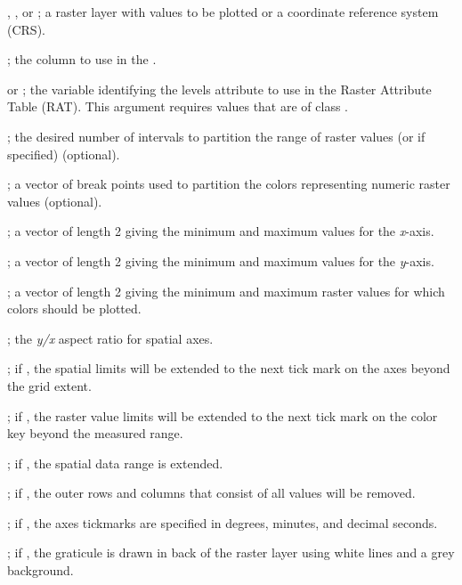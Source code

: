 \documentclass[a4paper]{book}
\begin{document}
\begin{Arguments}
\begin{ldescription}
\item[\code{r}] , , or ; a raster layer with values to be plotted or a coordinate reference system (CRS).
\item[\code{layer}] ; the column to use in the .
\item[\code{att}]  or ; the variable identifying the levels attribute to use in the Raster Attribute Table (RAT).
This argument requires  values that are of class .
\item[\code{n}] ; the desired number of intervals to partition the range of raster values (or  if specified) (optional).
\item[\code{breaks}] ; a vector of break points used to partition the colors representing numeric raster values (optional).
\item[\code{xlim}] ; a vector of length 2 giving the minimum and maximum values for the \emph{x}-axis.
\item[\code{ylim}] ; a vector of length 2 giving the minimum and maximum values for the \emph{y}-axis.
\item[\code{zlim}] ; a vector of length 2 giving the minimum and maximum raster values for which colors should be plotted.
\item[\code{asp}] ; the \emph{y/x} aspect ratio for spatial axes.
\item[\code{extend.xy}] ; if , the spatial limits will be extended to the next tick mark on the axes beyond the grid extent.
\item[\code{extend.z}] ; if , the raster value limits will be extended to the next tick mark on the color key beyond the measured range.
\item[\code{reg.axs}] ; if , the spatial data range is extended.
\item[\code{trim.r}] ; if , the outer rows and columns that consist of all  values will be removed.
\item[\code{dms.tick}] ; if , the axes tickmarks are specified in degrees, minutes, and decimal seconds.
\item[\code{bg.lines}] ; if , the graticule is drawn in back of the raster layer using white lines and a grey background.

\end{ldescription}
\end{Arguments}
\end{document}
